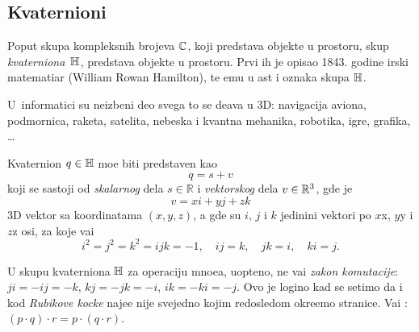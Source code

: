 \subsection{Kvaternioni}

\def\uv{{u}}
\def\vp{{v}}
\def\norm#1{{\vert#1\vert}}
\def\con#1{{\bar#1}}

Poput skupa kompleksnih brojeva ${\mathbb C}$, koji predstav{\lj}a objekte u  prostoru,
skup {\sl kvater\-niona\/}~${\mathbb H}$, predstav{\lj}a objekte u  prostoru. Prvi ih je opisao 
1843. godine irski ma\-te\-ma\-ti\-{\cv}ar
 (William Rowan Hamilton), te {\nj}emu u {\cv}ast i oznaka skupa ${\mathbb H}$.

U~informatici su neizbe{\zv}ni deo svega {\sv}to se de{\sv}ava u 3D:
navigacija aviona, pod\-mor\-nica, raketa, satelita,
nebeska i kvantna mehanika, robotika, igre, grafika, \dots

\medskip

Kvaternion $q\in{\mathbb H}$ mo{\zv}e biti predstav{\lj}en kao 
\begin{equation}
    q=s+\vp
\end{equation}
koji se sastoji od {\sl skalarnog\/} dela $s\in{\mathbb R}$ i {\sl vektorskog\/} dela $\vp\in\Rset^3$, gde je
\begin{equation}
    \vp=xi+yj+zk
\end{equation}
3D vektor sa koordinatama $(x,y,z)$, 
a gde su $i$, $j$ i $k$ jedini{\cv}ni vektori 
po $x$\idxaxis x, $y$\idxaxis y i $z$\idxaxis z osi,
za koje va{\zv}i
\begin{equation}\label{eq:qunits}
    i^2=j^2=k^2=ijk=-1,\quad
    ij=k,\quad jk=i,\quad ki=j. 
\end{equation}

\danger U skupu kvaterniona ${\mathbb H}$ za operaciju mno{\zv}e{\nj}a, uop{\sv}teno, ne va{\zv}i {\sl zakon komutacije}:
$ji=-ij=-k$, $kj=-jk=-i$, $ik=-ki=-j$.
Ovo je logi{\cv}no kad se setimo da i kod
{\sl Rubikove kocke\/} naj{\cv}e{\sv}{\cc}e nije svejedno kojim redosledom okre{\cc}emo stranice.
Va{\zv}i {\sl {}}: $(p\cdot q)\cdot r=p\cdot(q\cdot r)$.

\medskip

